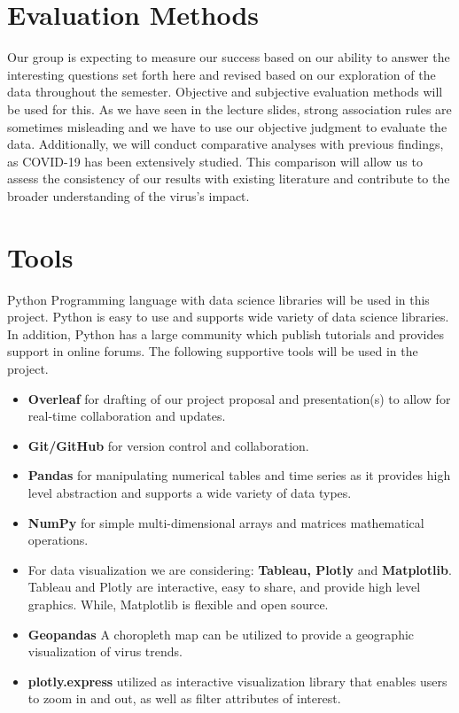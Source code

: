 \documentclass[sigconf,screen,nonacm]{acmart}
\begin{document}
\section{Evaluation Methods}
Our group is expecting to measure our success based on our ability to answer the interesting questions set forth here and revised based on our exploration of the data throughout the semester. Objective and subjective evaluation methods will be used for this. As we have seen in the lecture slides, strong association rules are sometimes misleading and we have to use our objective judgment to evaluate the data. Additionally, we will conduct comparative analyses with previous findings, as COVID-19 has been extensively studied. This comparison will allow us to assess the consistency of our results with existing literature and contribute to the broader understanding of the virus's impact.


\section{Tools}
Python Programming language with data science libraries will be used in this project. Python is easy to use and supports wide variety of data science libraries. In addition, Python has a large community which publish tutorials and provides support in online forums.
The following supportive tools will be used in the project. 
\begin{itemize}
\item \textbf{Overleaf} for drafting of our project proposal and presentation(s) to allow for real-time collaboration and updates.

\item \textbf{Git/GitHub} for version control and collaboration.
\item \textbf{Pandas} for manipulating numerical tables and time series as it provides high level abstraction and supports a wide variety of data types.
\item \textbf{NumPy} for simple multi-dimensional arrays and matrices mathematical operations.
\item For data visualization we are considering: \textbf{Tableau, Plotly} and \textbf{Matplotlib}. Tableau and Plotly are interactive, easy to share, and provide high level graphics. While, Matplotlib is flexible and open source. 
\item \textbf{Geopandas} A choropleth map can be utilized to provide a geographic visualization of virus trends.
\item \textbf{plotly.express} utilized as interactive visualization library that enables users to zoom in and out, as well as filter attributes of interest.

\end{itemize}
\end{document}
